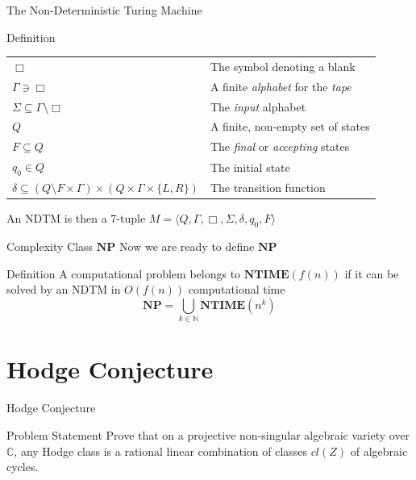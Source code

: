 \documentclass[handout]{beamer}
\newcommand{\Complex}{\mathbb{C}}
\newcommand{\Natural}{\mathbb{N}}
\newcommand{\NPTIME}{\mathbf{NP}}
\newcommand{\NTIME}{\mathbf{NTIME}}
\begin{document}
  \begin{frame}{The Non-Deterministic Turing Machine}
      \begin{block}{Definition}
          \pause
          \begin{table}[]
              \centering
              \begin{tabular}{ll}
                  $\Box$ & The symbol denoting a blank \pause \\
                  $\Gamma \ni \Box$
                  & A finite \textit{alphabet} for the \textit{tape} \pause \\
                  $\Sigma \subseteq \Gamma \setminus \Box$ 
                  & The \textit{input} alphabet \pause \\
                  $Q$ & A finite, non-empty set of states \pause \\
                  $F \subseteq Q$
                  & The \textit{final} or \textit{accepting} states \pause \\
                  $q_0 \in Q$ & The initial state \pause \\
                  $\delta \subseteq (Q \setminus F \times \Gamma ) \times (Q
                  \times \Gamma \times \{L, R\})$ & The transition function
              \end{tabular}
          \end{table}
          \pause
          An NDTM is then a 7-tuple
          $M = \langle Q, \Gamma, \Box, \Sigma, \delta, q_0, F \rangle$
      \end{block}
  \end{frame}
  \begin{frame}{Complexity Class $\NPTIME$}
      Now we are ready to define $\NPTIME$
      \pause
      \begin{block}{Definition}
          A computational problem belongs to
              $\NTIME\left(f(n)\right)$ if it can be solved by an
              NDTM in $O(f(n))$ computational time 
              \pause
          $$\NPTIME = \bigcup_{k \in \Natural}
              \NTIME\left(n^k\right)$$
      \end{block}
  \end{frame}
  \section{Hodge Conjecture}
  \begin{frame}{Hodge Conjecture}
      \begin{block}{Problem Statement}
          Prove that on a projective non-singular algebraic variety over
          $\Complex$, any Hodge class is a rational linear combination of
          classes $cl(Z)$ of algebraic cycles.
      \end{block}
  \end{frame}
\end{document}
